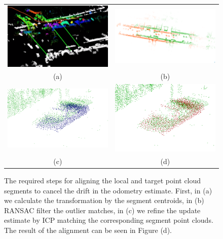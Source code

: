 \documentclass[letterpaper, 10 pt, conference]{ieeeconf}  %
\begin{document}
\begin{figure}[ht!]
    \begin{center} \begin{tabular}{c@{\hspace{1mm}}c@{\hspace{1mm}}}
        \includegraphics*[width=0.44\linewidth]{figures/match_recognition.png} &
        \includegraphics*[width=0.44\linewidth]{figures/prior_transform.png} \\
        (a) & (b) \\
        \includegraphics*[width=0.44\linewidth]{figures/after_align.png} &
        \includegraphics*[width=0.44\linewidth]{figures/icp_refine.png} \\
         (c) & (d)\\
    \end{tabular}
        \caption{The required steps for aligning the local and target point cloud segments to cancel the drift in the odometry estimate. First, in (a) we calculate the transformation by the segment centroids, in (b) RANSAC filter the outlier matches, in (c) we refine the update estimate by ICP matching the corresponding segment point clouds. The result of the alignment can be seen in Figure (d).}
    \label{fig:pose_refine}
    \end{center}
\end{figure}
\end{document}
